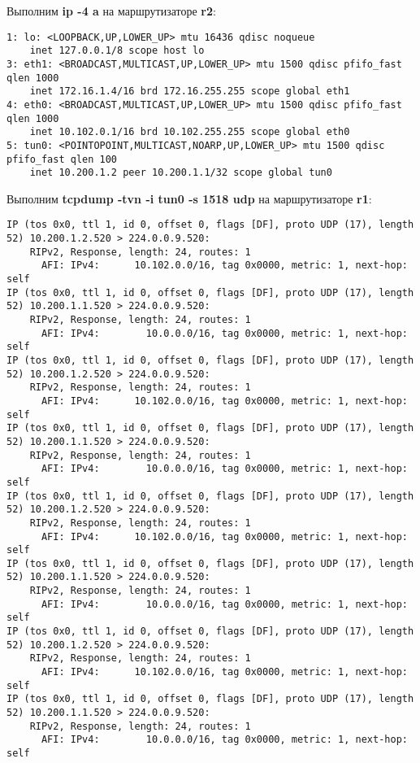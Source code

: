\documentclass[a4paper,12pt]{article}
\begin{document}
Выполним \textbf{ip -4 a} на маршрутизаторе \textbf{r2}:
\begin{Verbatim}
1: lo: <LOOPBACK,UP,LOWER_UP> mtu 16436 qdisc noqueue 
    inet 127.0.0.1/8 scope host lo
3: eth1: <BROADCAST,MULTICAST,UP,LOWER_UP> mtu 1500 qdisc pfifo_fast qlen 1000
    inet 172.16.1.4/16 brd 172.16.255.255 scope global eth1
4: eth0: <BROADCAST,MULTICAST,UP,LOWER_UP> mtu 1500 qdisc pfifo_fast qlen 1000
    inet 10.102.0.1/16 brd 10.102.255.255 scope global eth0
5: tun0: <POINTOPOINT,MULTICAST,NOARP,UP,LOWER_UP> mtu 1500 qdisc pfifo_fast qlen 100
    inet 10.200.1.2 peer 10.200.1.1/32 scope global tun0
\end{Verbatim}

Выполним \textbf{tcpdump -tvn -i tun0 -s 1518 udp} на маршрутизаторе
\textbf{r1}:
\begin{Verbatim}
IP (tos 0x0, ttl 1, id 0, offset 0, flags [DF], proto UDP (17), length 52) 10.200.1.2.520 > 224.0.0.9.520: 
	RIPv2, Response, length: 24, routes: 1
	  AFI: IPv4:      10.102.0.0/16, tag 0x0000, metric: 1, next-hop: self
IP (tos 0x0, ttl 1, id 0, offset 0, flags [DF], proto UDP (17), length 52) 10.200.1.1.520 > 224.0.0.9.520: 
	RIPv2, Response, length: 24, routes: 1
	  AFI: IPv4:        10.0.0.0/16, tag 0x0000, metric: 1, next-hop: self
IP (tos 0x0, ttl 1, id 0, offset 0, flags [DF], proto UDP (17), length 52) 10.200.1.2.520 > 224.0.0.9.520: 
	RIPv2, Response, length: 24, routes: 1
	  AFI: IPv4:      10.102.0.0/16, tag 0x0000, metric: 1, next-hop: self
IP (tos 0x0, ttl 1, id 0, offset 0, flags [DF], proto UDP (17), length 52) 10.200.1.1.520 > 224.0.0.9.520: 
	RIPv2, Response, length: 24, routes: 1
	  AFI: IPv4:        10.0.0.0/16, tag 0x0000, metric: 1, next-hop: self
IP (tos 0x0, ttl 1, id 0, offset 0, flags [DF], proto UDP (17), length 52) 10.200.1.2.520 > 224.0.0.9.520: 
	RIPv2, Response, length: 24, routes: 1
	  AFI: IPv4:      10.102.0.0/16, tag 0x0000, metric: 1, next-hop: self
IP (tos 0x0, ttl 1, id 0, offset 0, flags [DF], proto UDP (17), length 52) 10.200.1.1.520 > 224.0.0.9.520: 
	RIPv2, Response, length: 24, routes: 1
	  AFI: IPv4:        10.0.0.0/16, tag 0x0000, metric: 1, next-hop: self
IP (tos 0x0, ttl 1, id 0, offset 0, flags [DF], proto UDP (17), length 52) 10.200.1.2.520 > 224.0.0.9.520: 
	RIPv2, Response, length: 24, routes: 1
	  AFI: IPv4:      10.102.0.0/16, tag 0x0000, metric: 1, next-hop: self
IP (tos 0x0, ttl 1, id 0, offset 0, flags [DF], proto UDP (17), length 52) 10.200.1.1.520 > 224.0.0.9.520: 
	RIPv2, Response, length: 24, routes: 1
	  AFI: IPv4:        10.0.0.0/16, tag 0x0000, metric: 1, next-hop: self

\end{Verbatim}
\end{document}
